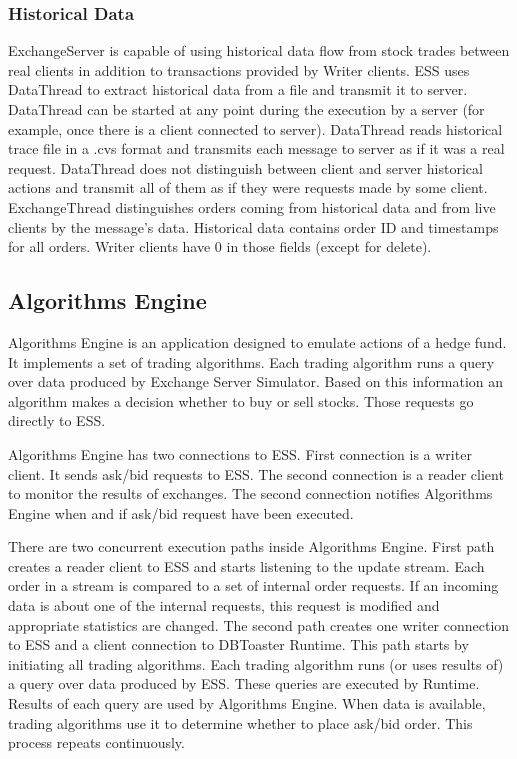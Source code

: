 \documentclass[14pt]{article}
\begin{document}
\subsubsection{Historical Data}

ExchangeServer is capable of using historical data flow from stock trades between real clients in addition to transactions provided by Writer clients. ESS uses DataThread to extract historical data from a file and transmit it to server. DataThread can be started at any point during the execution by a server (for example, once there is a client connected to server). DataThread reads historical trace file in a .cvs format and transmits each message to server as if it was a real request. DataThread does not distinguish between client and server historical actions and transmit all of them as if they were requests made by some client. ExchangeThread distinguishes orders coming from historical data and from live clients by the message's data. Historical data contains order ID and timestamps for all orders. Writer clients have 0 in those fields (except for delete).  


\subsection{Algorithms Engine}

Algorithms Engine is an application designed to emulate actions of a hedge fund. It implements a set of trading algorithms. Each trading algorithm runs a query over data produced by Exchange Server Simulator. Based on this information an algorithm makes a decision whether to buy or sell stocks. Those requests go directly to ESS. 

Algorithms Engine has two connections to ESS. First connection is a writer client. It sends ask/bid requests to ESS. The second connection is a reader client to monitor the results of exchanges. The second connection notifies Algorithms Engine when and if ask/bid request have been executed. 

There are two concurrent execution paths inside Algorithms Engine. First path creates a reader client to ESS and starts listening to the update stream. Each order in a stream is compared to a set of internal order requests. If an incoming data is about one of the internal requests, this request is modified and appropriate statistics are changed. The second path creates one writer connection to ESS and a client connection to DBToaster Runtime. This path starts by initiating all trading algorithms. Each  trading algorithm runs (or uses results of) a query over data produced by ESS. These queries are executed by Runtime. Results of each query are used by Algorithms Engine. When data is available, trading algorithms use it to determine whether to place ask/bid order. This process repeats continuously. 
\end{document}
